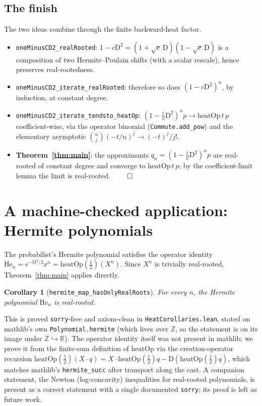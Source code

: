 \documentclass[11pt]{article}
\newtheorem{corollary}[theorem]{Corollary}
\theoremstyle{definition}
\theoremstyle{remark}
\newcommand{\R}{\mathbb{R}}
\newcommand{\heatop}{\mathrm{heatOp}}
\newcommand{\D}{\mathrm{D}}
\begin{document}
\subsection{The finish}
The two ideas combine through the finite backward-heat factor.
\begin{itemize}
  \item \texttt{oneMinusCD2\_realRooted}: $1 - c\D^2 = (1+\sqrt{c}\,\D)(1-\sqrt{c}\,\D)$ is a
  composition of two Hermite--Poulain shifts (with a scalar rescale), hence preserves real-rootedness.
  \item \texttt{oneMinusCD2\_iterate\_realRooted}: therefore so does $(1-c\D^2)^n$, by induction, at
  constant degree.
  \item \texttt{oneMinusCD2\_iterate\_tendsto\_heatOp}: $(1-\tfrac{t}{n}\D^2)^n p \to \heatop\,t\,p$
  coefficient-wise, via the operator binomial (\texttt{Commute.add\_pow}) and the elementary
  asymptotic $\binom{n}{j}(-t/n)^j \to (-t)^j/j!$.
  \item \textbf{Theorem~\ref{thm:main}}: the approximants $q_n = (1-\tfrac{t}{n}\D^2)^n p$ are
  real-rooted of constant degree and converge to $\heatop\,t\,p$; by the coefficient-limit lemma the
  limit is real-rooted. $\qed$
\end{itemize}

\section{A machine-checked application: Hermite polynomials}\label{sec:hermite}

The probabilist's Hermite polynomial satisfies the operator identity $\mathrm{He}_n =
e^{-\D^2/2}x^n = \heatop(\tfrac12)(X^n)$. Since $X^n$ is trivially real-rooted, Theorem~\ref{thm:main}
applies directly.

\begin{corollary}[\texttt{hermite\_map\_hasOnlyRealRoots}]\label{cor:hermite}
For every $n$, the Hermite polynomial $\mathrm{He}_n$ is real-rooted.
\end{corollary}

This is proved \texttt{sorry}-free and axiom-clean in \texttt{HeatCorollaries.lean}, stated on
mathlib's own \texttt{Polynomial.hermite} (which lives over $\mathbb{Z}$, so the statement is on its
image under $\mathbb{Z}\hookrightarrow\R$). The operator identity itself was not present in mathlib;
we prove it from the finite-sum definition of $\heatop$ via the creation-operator recursion
$\heatop(\tfrac12)(X\cdot q) = X\cdot \heatop(\tfrac12)q - \D(\heatop(\tfrac12)q)$, which matches
mathlib's \texttt{hermite\_succ} after transport along the cast. A companion statement, the Newton
(log-concavity) inequalities for real-rooted polynomials, is present as a correct statement with a
single documented \texttt{sorry}; its proof is left as future work.
\end{document}
